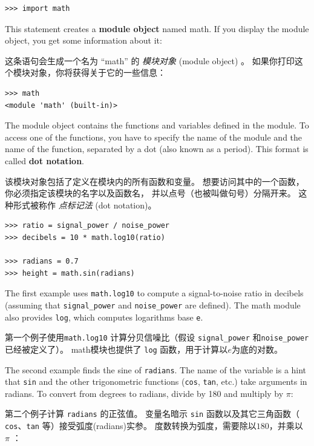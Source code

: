 \begin{lstlisting}
>>> import math
\end{lstlisting}
%
This statement creates a {\bf module object} named math.  If
you display the module object, you get some information about it:

这条语句会生成一个名为 ``math'' 的 \emph{模块对象} (module object) 。
如果你打印这个模块对象，你将获得关于它的一些信息：


\begin{lstlisting}
>>> math
<module 'math' (built-in)>
\end{lstlisting}

%
The module object contains the functions and variables defined in the
module.  To access one of the functions, you have to specify the name
of the module and the name of the function, separated by a dot (also
known as a period).  This format is called {\bf dot notation}.

该模块对象包括了定义在模块内的所有函数和变量。
想要访问其中的一个函数，你必须指定该模块的名字以及函数名，
并以点号（也被叫做句号）分隔开来。 这种形式被称作 \emph{点标记法} (dot
notation)。
  

\begin{lstlisting}
>>> ratio = signal_power / noise_power
>>> decibels = 10 * math.log10(ratio)

>>> radians = 0.7
>>> height = math.sin(radians)
\end{lstlisting}

%
The first example uses \verb"math.log10" to compute
a signal-to-noise ratio in decibels (assuming that \verb"signal_power" and
\verb"noise_power" are defined).  The math module also provides {\tt log},
which computes logarithms base {\tt e}.

第一个例子使用\lstinline{math.log10} 计算分贝信噪比（假设 \lstinline{signal_power}  和\lstinline{noise_power} 已经被定义了）。
math模块也提供了 \lstinline{log} 函数，用于计算以$e$为底的对数。
    
    

The second example finds the sine of {\tt radians}.  The name of the
variable is a hint that {\tt sin} and the other trigonometric
functions ({\tt cos}, {\tt tan}, etc.)  take arguments in radians. To
convert from degrees to radians, divide by 180 and multiply by
$\pi$:

第二个例子计算 \lstinline{radians} 的正弦值。
变量名暗示 \lstinline{sin} 函数以及其它三角函数（ \lstinline{cos}、\lstinline{tan} 等）接受弧度(radians)实参。
度数转换为弧度，需要除以$180$，并乘以 $\pi$ ：



